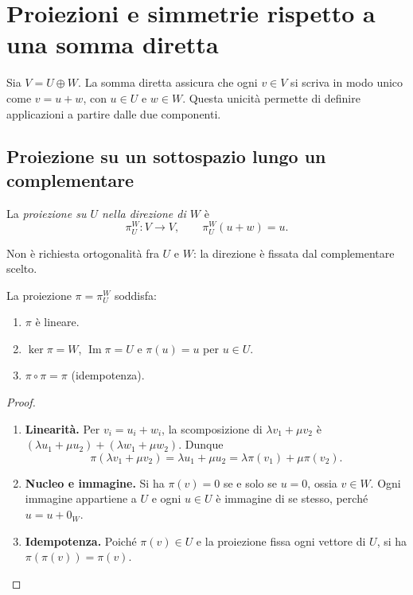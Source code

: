 \section{Proiezioni e simmetrie rispetto a una somma diretta}
Sia $V=U\oplus W$. La somma diretta assicura che ogni $v\in V$ si scriva in modo unico come $v=u+w$, con $u\in U$ e $w\in W$. Questa unicità permette di definire applicazioni a partire dalle due componenti.

\subsection{Proiezione su un sottospazio lungo un complementare}
\begin{definizione}
La \emph{proiezione su $U$ nella direzione di $W$} è
\[
 \pi_U^W:V\longrightarrow V,\qquad \pi_U^W(u+w)=u.
\]
\end{definizione}
\begin{schema}
\end{schema}
Non è richiesta ortogonalità fra $U$ e $W$: la direzione è fissata dal complementare scelto.
\begin{proposizione}
La proiezione $\pi=\pi_U^W$ soddisfa:
\begin{enumerate}[label=\arabic*.]
\item $\pi$ è lineare.
\item $\ker\pi=W$, $\operatorname{Im}\pi=U$ e $\pi(u)=u$ per $u\in U$.
\item $\pi\circ\pi=\pi$ (idempotenza).
\end{enumerate}
\end{proposizione}
\begin{proof}
\begin{enumerate}[label=\arabic*.]
\item \textbf{Linearità.} Per $v_i=u_i+w_i$, la scomposizione di $\lambda v_1+\mu v_2$ è $(\lambda u_1+\mu u_2)+(\lambda w_1+\mu w_2)$. Dunque
\[
 \pi(\lambda v_1+\mu v_2)=\lambda u_1+\mu u_2=\lambda\pi(v_1)+\mu\pi(v_2).
\]
\item \textbf{Nucleo e immagine.} Si ha $\pi(v)=0$ se e solo se $u=0$, ossia $v\in W$. Ogni immagine appartiene a $U$ e ogni $u\in U$ è immagine di se stesso, perché $u=u+0_W$.
\item \textbf{Idempotenza.} Poiché $\pi(v)\in U$ e la proiezione fissa ogni vettore di $U$, si ha $\pi(\pi(v))=\pi(v)$.
\end{enumerate}
\end{proof}

